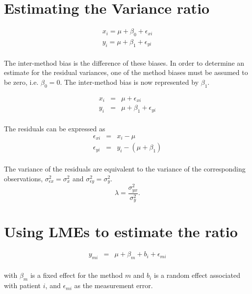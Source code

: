 \documentclass[Chap3amain.tex]{subfiles}
\begin{document}
\section{Estimating the Variance ratio}


\begin{eqnarray*}
x_{i} = \mu +  \beta_{0} + \epsilon_{xi}\\
y_{i} = \mu +  \beta_{1} + \epsilon_{yi}\\
\end{eqnarray*}

The inter-method bias is the difference of these biases. In order
to determine an estimate for the residual variances, one of the
method biases must be assumed to be zero, i.e. $\beta_{0} = 0$.
The inter-method bias is now represented by $\beta_{1}$.

\begin{eqnarray*}
x_{i} &=& \mu + \epsilon_{xi}\\
y_{i} &=& \mu +  \beta_{1} + \epsilon_{yi}\\
\end{eqnarray*}


The residuals can be expressed as
\begin{eqnarray*}
\epsilon_{xi} &=& x_{i} - \mu  \\
\epsilon_{yi} &=& y_{i} - (\mu + \beta_{1}) \\
\end{eqnarray*}

The variance of the residuals are equivalent to the variance of
the corresponding observations, $\sigma^{2}_{\epsilon x} =
\sigma^{2}_{x}$ and $\sigma^{2}_{\epsilon y} = \sigma^{2}_{y}$.
\begin{equation}
\lambda = \frac{\sigma^{2}_{yx}}{\sigma^{2}_{y}}.
\end{equation}

\newpage
\section{Using LMEs to estimate the ratio}

\begin{eqnarray*}
y_{mi} &=& \mu + \beta_{m} + b_{i} + \epsilon_{mi}\\
\end{eqnarray*}

with $\beta_{m}$ is a fixed effect for the method $m$ and $b_{i}$
is a random effect associated with patient $i$, and
$\epsilon_{mi}$ as the measurement error.
\end{document}
